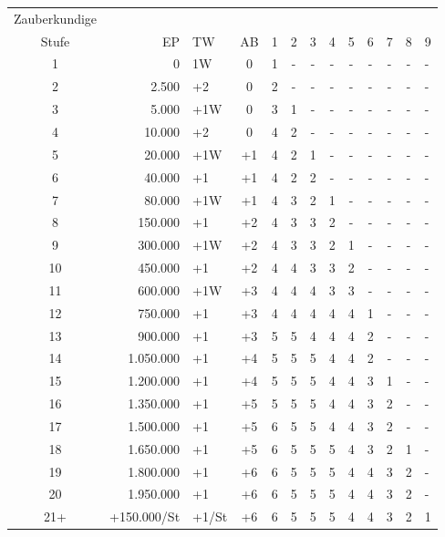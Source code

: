 \documentclass[11pt]{wbzine}
\begin{document}
\begin{tabularx}{\textwidth}{crlcccccccccZ}
    Zauberkundige & & & & & & & & & & & &  \\
  Stufe & EP & TW    & AB & 1 & 2 & 3 & 4 & 5 & 6 & 7 & 8 & 9 \\
  1     &  0 & 1W    & 0  & 1 & - & - & - & - & - & - & - & - \\
  2     & 2.500 & +2    & 0  & 2 & - & - & - & - & - & - & - & - \\
  3     & 5.000 & +1W   & 0  & 3 & 1 & - & - & - & - & - & - & - \\
  4     &10.000 & +2    & 0  & 4 & 2 & - & - & - & - & - & - & - \\
  5     &20.000 & +1W   & +1 & 4 & 2 & 1 & - & - & - & - & - & - \\
  6     &40.000 & +1    & +1 & 4 & 2 & 2 & - & - & - & - & - & - \\
  7     &80.000 & +1W   & +1 & 4 & 3 & 2 & 1 & - & - & - & - & - \\
  8     &     150.000 & +1    & +2 & 4 & 3 & 3 & 2 & - & - & - & - & - \\
  9     &     300.000 & +1W   & +2 & 4 & 3 & 3 & 2 & 1 & - & - & - & - \\
  10    &     450.000 & +1    & +2 & 4 & 4 & 3 & 3 & 2 & - & - & - & - \\
  11    &     600.000 & +1W   & +3 & 4 & 4 & 4 & 3 & 3 & - & - & - & - \\ 
  12    &     750.000 & +1    & +3 & 4 & 4 & 4 & 4 & 4 & 1 & - & - & - \\ 
  13    &     900.000 & +1    & +3 & 5 & 5 & 4 & 4 & 4 & 2 & - & - & - \\ 
  14    &   1.050.000 & +1    & +4 & 5 & 5 & 5 & 4 & 4 & 2 & - & - & - \\ 
  15    &   1.200.000 & +1    & +4 & 5 & 5 & 5 & 4 & 4 & 3 & 1 & - & - \\ 
  16    &   1.350.000 & +1    & +5 & 5 & 5 & 5 & 4 & 4 & 3 & 2 & - & - \\ 
  17    &   1.500.000 & +1    & +5 & 6 & 5 & 5 & 4 & 4 & 3 & 2 & - & - \\ 
  18    &   1.650.000 & +1    & +5 & 6 & 5 & 5 & 5 & 4 & 3 & 2 & 1 & - \\ 
  19    &   1.800.000 & +1    & +6 & 6 & 5 & 5 & 5 & 4 & 4 & 3 & 2 & - \\ 
  20    &   1.950.000 & +1    & +6 & 6 & 5 & 5 & 5 & 4 & 4 & 3 & 2 & - \\ 
  21+   & +150.000/St & +1/St & +6 & 6 & 5 & 5 & 5 & 4 & 4 & 3 & 2 & 1 \\ 
\end{tabularx}
\end{document}
